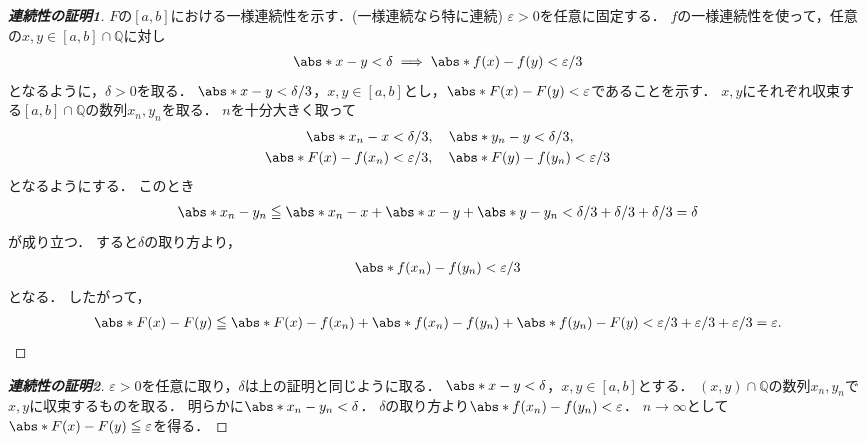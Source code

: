\begin{leftbar}
    \begin{proof}[\textup{\textbf{連続性の証明1}}]
        $F$の$[a,b]$における一様連続性を示す．(一様連続なら特に連続)
        $\varepsilon >0$を任意に固定する．
        $f$の一様連続性を使って，任意の$x,y \in [a,b] \cap \mathbb{Q}$に対し
        \begin{align*}
            \abs*{x-y} < \delta \implies \abs*{f(x) - f(y)} < \varepsilon/3
        \end{align*}
        となるように，$\delta > 0$を取る．
        $\abs*{x-y} < \delta/3$，$x,y \in [a,b]$とし，$\abs*{F(x)-F(y)} < \varepsilon$であることを示す．
        $x,y$にそれぞれ収束する$[a,b] \cap \mathbb{Q}$の数列$x_n,y_n$を取る．
        $n$を十分大きく取って
        \begin{align*}
            \abs*{x_n-x}       & < \delta/3, \quad \abs*{y_n-y} < \delta/3,                \\
            \abs*{F(x)-f(x_n)} & < \varepsilon/3, \quad \abs*{F(y)-f(y_n)} < \varepsilon/3
        \end{align*}
        となるようにする．
        このとき
        \begin{align*}
            \abs*{x_n-y_n} \le \abs*{x_n-x} + \abs*{x-y} + \abs*{y-y_n} < \delta/3 + \delta/3 + \delta/3 = \delta
        \end{align*}
        が成り立つ．
        すると$\delta$の取り方より，
        \begin{align*}
            \abs*{f(x_n)-f(y_n)} < \varepsilon/3
        \end{align*}
        となる．
        したがって，
        \begin{align*}
            \abs*{F(x)-F(y)} \le \abs*{F(x)-f(x_n)} + \abs*{f(x_n)-f(y_n)} + \abs*{f(y_n)-F(y)}
            < \varepsilon/3 + \varepsilon/3 + \varepsilon/3 = \varepsilon.
        \end{align*}
    \end{proof}
\end{leftbar}

\begin{leftbar}
    \begin{proof}[\textup{\textbf{連続性の証明2}}]
        $\varepsilon>0$を任意に取り，$\delta$は上の証明と同じように取る．
        $\abs*{x-y} < \delta$，$x,y \in [a,b]$とする．
        $(x,y) \cap \mathbb{Q}$の数列$x_n,y_n$で$x,y$に収束するものを取る．
        明らかに$\abs*{x_n-y_n}<\delta$．
        $\delta$の取り方より$\abs*{f(x_n)-f(y_n)}<\varepsilon$．
        $n \to \infty$として$\abs*{F(x)-F(y)} \le \varepsilon$を得る．
    \end{proof}
\end{leftbar}


